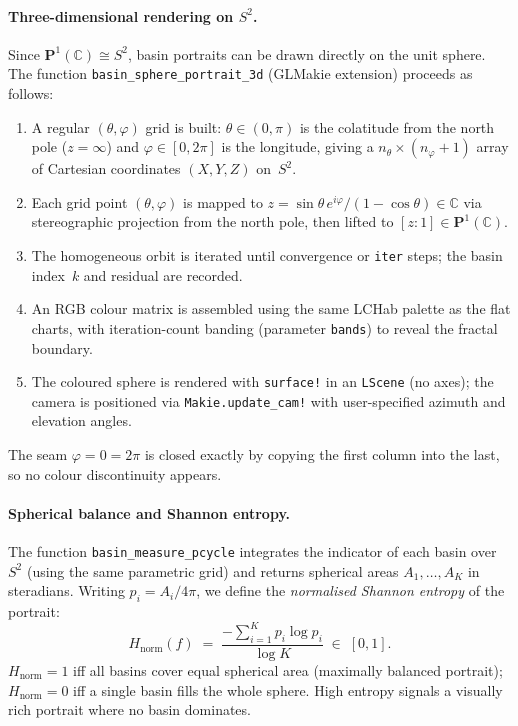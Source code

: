 \documentclass[12pt]{article}
\theoremstyle{definition}
\newcommand{\C}{\mathbb{C}}
\newcommand{\Pone}{\mathbf{P}^1(\C)}
\begin{document}
\paragraph{Three-dimensional rendering on $S^2$.}
Since $\Pone\cong S^2$, basin portraits can be drawn
directly on the unit sphere.
The function \texttt{basin\_sphere\_portrait\_3d}
(GLMakie extension) proceeds as follows:
\begin{enumerate}[label=(\roman*)]
  \item A regular $(\theta,\varphi)$ grid is built:
        $\theta\in(0,\pi)$ is the colatitude from the north pole
        ($z=\infty$) and $\varphi\in[0,2\pi]$ is the longitude,
        giving a $n_\theta\times(n_\varphi+1)$ array of Cartesian
        coordinates $(X,Y,Z)$ on~$S^2$.
  \item Each grid point $(\theta,\varphi)$ is mapped to
        $z = \sin\theta\,e^{i\varphi}/(1-\cos\theta)\in\mathbb{C}$
        via stereographic projection from the north pole, then
        lifted to $[z:1]\in\Pone$.
  \item The homogeneous orbit is iterated until convergence or
        \texttt{iter} steps; the basin index~$k$ and residual are
        recorded.
  \item An RGB colour matrix is assembled using the same LCHab
        palette as the flat charts, with iteration-count banding
        (parameter \texttt{bands}) to reveal the fractal boundary.
  \item The coloured sphere is rendered with \texttt{surface!} in
        an \texttt{LScene} (no axes); the camera is positioned via
        \texttt{Makie.update\_cam!} with user-specified azimuth and
        elevation angles.
\end{enumerate}
The seam $\varphi=0=2\pi$ is closed exactly by copying the first column
into the last, so no colour discontinuity appears.

\paragraph{Spherical balance and Shannon entropy.}
The function \texttt{basin\_measure\_pcycle} integrates the
indicator of each basin over~$S^2$ (using the same parametric grid)
and returns spherical areas $A_1,\ldots,A_K$ in steradians.
Writing $p_i = A_i/4\pi$, we define the
\emph{normalised Shannon entropy} of the portrait:
\begin{equation}\label{eq:entropy}
  H_{\mathrm{norm}}(f)
  \;=\;
  \frac{-\displaystyle\sum_{i=1}^{K} p_i\log p_i}{\log K}
  \;\in\;[0,1].
\end{equation}
$H_{\mathrm{norm}}=1$ iff all basins cover equal spherical area
(maximally balanced portrait);
$H_{\mathrm{norm}}=0$ iff a single basin fills the whole sphere.
High entropy signals a visually rich portrait where no basin dominates.
\end{document}
